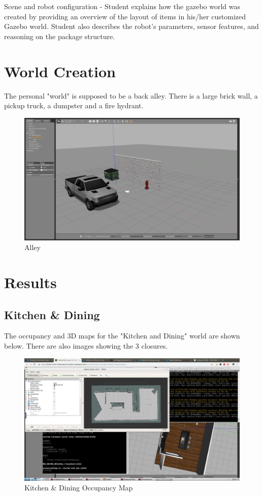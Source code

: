 \documentclass[10pt,journal,compsoc]{IEEEtran}
\begin{document}
Scene and robot configuration - Student explains how the gazebo world was created by providing an overview of the layout of items in his/her customized Gazebo world. Student also describes the robot's parameters, sensor features, and reasoning on the package structure.

\section{World Creation}
The personal "world" is supposed to be a back alley. There is a large brick wall, a pickup truck, a dumpster and a fire hydrant.

\begin{figure}[thpb]
    \centering
    \includegraphics[width=\linewidth]{alley_gazebo}
    \caption{Alley}
    \label{fig:alley}
\end{figure}

\section{Results}

\subsection{Kitchen \& Dining}

The occupancy and 3D maps for the "Kitchen and Dining" world are shown below. There are also images showing the 3 closures.

\begin{figure}[thpb]
    \centering
    \includegraphics[width=\linewidth]{dining_map}
    \caption{Kitchen \& Dining Occupancy Map}
    \label{fig:dining_2d}
\end{figure}
\end{document}

